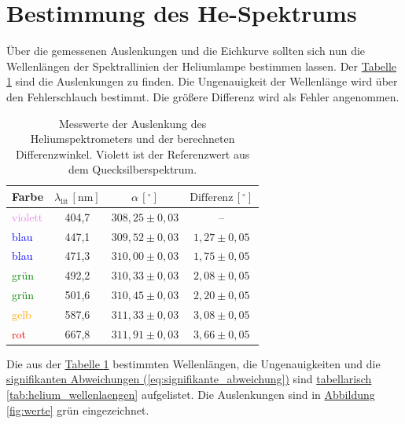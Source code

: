 \section{Bestimmung des He-Spektrums}
Über die gemessenen Auslenkungen und die Eichkurve sollten sich nun die Wellenlängen der Spektrallinien der Heliumlampe bestimmen lassen. Der \hyperref[tab:helium_spektrum]{Tabelle \ref*{tab:helium_spektrum}} sind die Auslenkungen zu finden. Die Ungenauigkeit der Wellenlänge wird über den Fehlerschlauch bestimmt. Die größere Differenz wird als Fehler angenommen. 


\begin{table}[h!]
    \centering
    \label{tab:helium_spektrum}
    \begin{tabular}{lccc}
        \hline
        \textbf{Farbe} & \(\lambda_{\text{lit}}\, [\text{nm}]\) & \(\alpha \,[^\circ]\) & \(\text{Differenz}\,[^\circ]\) \\
        \hline
    \textcolor{violet}{violett} & 404,7 & \(308,25 \pm 0,03\) & -- \\
    \midrule
    \textcolor{blue}{blau} & 447,1 & \(309,52 \pm 0,03\) & \(1,27 \pm 0,05\) \\
    \textcolor{blue}{blau} & 471,3 & \(310,00 \pm 0,03\) & \(1,75 \pm 0,05\) \\
    \textcolor{green}{grün} & 492,2 & \(310,33 \pm 0,03\) & \(2,08 \pm 0,05\) \\
    \textcolor{green}{grün} & 501,6 & \(310,45 \pm 0,03\) & \(2,20 \pm 0,05\) \\
    \textcolor{orange}{gelb} & 587,6 & \(311,33 \pm 0,03\) & \(3,08 \pm 0,05\) \\
    \textcolor{red}{rot} & 667,8 & \(311,91 \pm 0,03\) & \(3,66 \pm 0,05\) \\
    \hline
\end{tabular}
\caption{Messwerte der Auslenkung des Heliumspektrometers und der berechneten Differenzwinkel. Violett ist der Referenzwert aus dem Quecksilberspektrum.}
\end{table}

Die aus der \hyperref[tab:helium_spektrum]{Tabelle \ref*{tab:helium_spektrum}} bestimmten Wellenlängen, die Ungenauigkeiten und die \hyperref[eq:signifikante_abweichung]{signifikanten Abweichungen (\ref*{eq:signifikante_abweichung})} sind \hyperref[tab:helium_wellenlaengen]{tabellarisch \ref*{tab:helium_wellenlaengen}} aufgelistet.
Die Auslenkungen sind in \hyperref[fig:werte]{Abbildung \ref*{fig:werte}} grün eingezeichnet.

